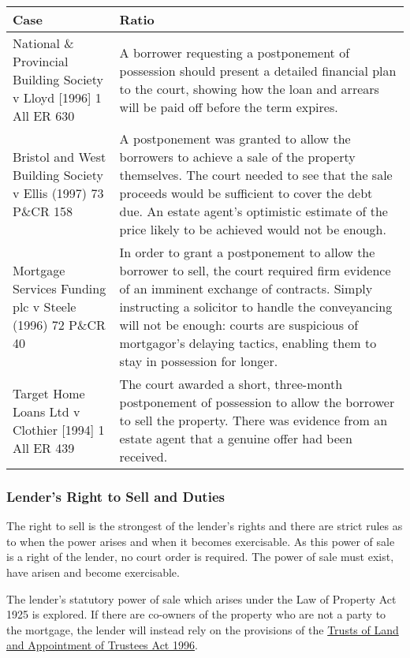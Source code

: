 \documentclass[
]{article}
\begin{document}
\begin{longtable}[]{@{}ll@{}}
\toprule()
Case & Ratio \\
\midrule()
\endhead
National \& Provincial Building Society v Lloyd {[}1996{]} 1 All ER 630
& A borrower requesting a postponement of possession should present a
detailed financial plan to the court, showing how the loan and arrears
will be paid off before the term expires. \\
Bristol and West Building Society v Ellis (1997) 73 P\&CR 158 & A
postponement was granted to allow the borrowers to achieve a sale of the
property themselves. The court needed to see that the sale proceeds
would be sufficient to cover the debt due. An estate agent's optimistic
estimate of the price likely to be achieved would not be enough. \\
Mortgage Services Funding plc v Steele (1996) 72 P\&CR 40 & In order to
grant a postponement to allow the borrower to sell, the court required
firm evidence of an imminent exchange of contracts. Simply instructing a
solicitor to handle the conveyancing will not be enough: courts are
suspicious of mortgagor's delaying tactics, enabling them to stay in
possession for longer. \\
Target Home Loans Ltd v Clothier {[}1994{]} 1 All ER 439 & The court
awarded a short, three-month postponement of possession to allow the
borrower to sell the property. There was evidence from an estate agent
that a genuine offer had been received. \\
\bottomrule()
\end{longtable}

\hypertarget{lenders-right-to-sell-and-duties}{%
\subsubsection{Lender's Right to Sell and
Duties}\label{lenders-right-to-sell-and-duties}}

The right to sell is the strongest of the lender's rights and there are
strict rules as to when the power arises and when it becomes
exercisable. As this power of sale is a right of the lender, no court
order is required. The power of sale must exist, have arisen and become
exercisable.

The lender's statutory power of sale which arises under the Law of
Property Act 1925 is explored. If there are co-owners of the property
who are not a party to the mortgage, the lender will instead rely on the
provisions of the
\href{https://www.legislation.gov.uk/ukpga/1996/47/contents}{Trusts of
Land and Appointment of Trustees Act 1996}.
\end{document}
